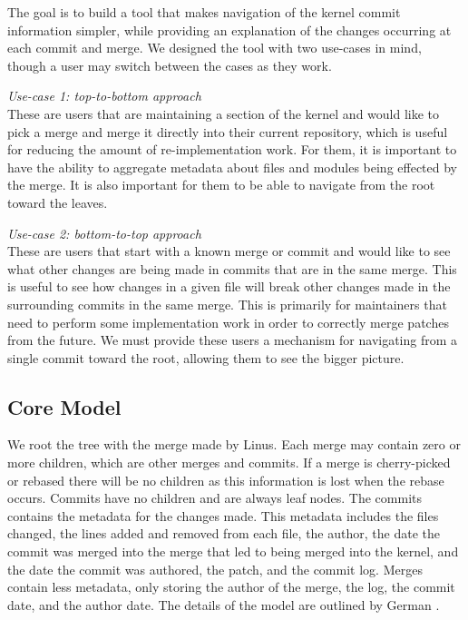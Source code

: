 \documentclass[conference, draftclsnofoot, draft]{IEEEtran}
\begin{document}
The goal is to build a tool that makes navigation of the kernel commit information
simpler, while providing an explanation of the changes occurring at each commit and
merge. We designed the tool with two use-cases in mind, though a user may switch
between the cases as they work.

\textit{Use-case 1: top-to-bottom approach}\label{sec:usecase1}\\
These are users that are maintaining a section of the kernel and would like to pick
a merge and merge it directly into their current repository, which is useful for
reducing the amount of re-implementation work. For them, it is important to have the
ability to aggregate metadata about files and modules being effected by the merge.
It is also important for them to be able to navigate from the root toward the
leaves.

\textit{Use-case 2: bottom-to-top approach}\label{sec:usecase2}\\
These are users that start with a known merge or commit and would like to see what
other changes are being made in commits that are in the same merge. This is useful
to see how changes in a given file will break other changes made in the surrounding
commits in the same merge. This is primarily for maintainers that need to perform
some implementation work in order to correctly merge patches from the future. We
must provide these users a mechanism for navigating from a single commit toward the
root, allowing them to see the bigger picture.

\subsection{Core Model}

We root the tree with the merge made by Linus. Each merge may contain zero or more
children, which are other merges and commits. If a merge is cherry-picked or rebased
there will be no children as this information is lost when the rebase occurs.
Commits have no children and are always leaf nodes. The commits contains the
metadata for the changes made. This metadata includes the files changed, the lines
added and removed from each file, the author, the date the commit was merged into
the merge that led to being merged into the kernel, and the date the commit was
authored, the patch, and the commit log. Merges contain less metadata, only storing
the author of the merge, the log, the commit date, and the author date. The details
of the model are outlined by German \cite{German2015}.
\end{document}
